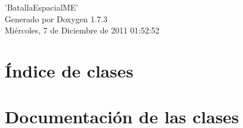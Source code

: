 \documentclass[a4paper]{book}
\begin{document}
\hypersetup{pageanchor=false}
\begin{titlepage}
\vspace*{7cm}
\begin{center}
{\Large 'BatallaEspacialME' }\\
\vspace*{1cm}
{\large Generado por Doxygen 1.7.3}\\
\vspace*{0.5cm}
{\small Miércoles, 7 de Diciembre de 2011 01:52:52}\\
\end{center}
\end{titlepage}
\clearemptydoublepage
{}
\tableofcontents
\clearemptydoublepage
{}
\hypersetup{pageanchor=true}
\chapter{Índice de clases}

\chapter{Documentación de las clases}















\printindex
\end{document}
